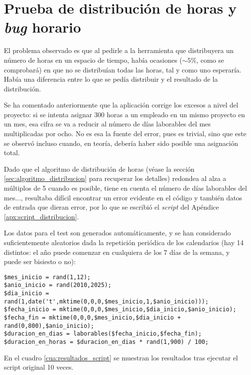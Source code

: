 \section{Prueba de distribución de horas y \textit{bug} horario}

El problema observado es que al pedirle a la herramienta que distribuyera un
número de horas en un espacio de tiempo, había ocasiones ($\sim 5\%$, como se
comprobará) en que no se distribuían todas las horas, tal y como uno esperaría.
Había una diferencia entre lo que se pedía distribuir y el resultado de la
distribución.

Se ha comentado anteriormente que la aplicación corrige los excesos a nivel del
proyecto: si se intenta asignar 300 horas a un empleado en un mismo proyecto en
un mes, esa cifra se va a reducir al número de días laborables del mes
multiplicadas por ocho. No es esa la fuente del error, pues es trivial, sino
que este se observó incluso cuando, en teoría, debería haber sido posible una
asignación total.

Dado que el algoritmo de distribución de horas (véase la sección
\ref{sec:algoritmo_distribucion} para recuperar los detalles) redondea al alza a
múltiplos de 5 cuando es posible, tiene en cuenta el número de días laborables
del mes..., resultaba difícil encontrar un error evidente en el código y
también datos de entrada que dieran error, por
lo que se escribió el \textit{script} del Apéndice
\ref{apx:script_distribucion}.

Los datos para el test son generados automáticamente, y se han
considerado suficientemente aleatorios dada la repetición periódica de los
calendarios (hay 14 distintos: el año puede comenzar en cualquiera de los 7 días
de la semana, y puede ser bisiesto o no):

\begin{lstlisting}
$mes_inicio = rand(1,12);
$anio_inicio = rand(2010,2025);
$dia_inicio = rand(1,date('t',mktime(0,0,0,$mes_inicio,1,$anio_inicio)));
$fecha_inicio = mktime(0,0,0,$mes_inicio,$dia_inicio,$anio_inicio);
$fecha_fin = mktime(0,0,0,$mes_inicio,$dia_inicio + rand(0,800),$anio_inicio);
$duracion_en_dias = laborables($fecha_inicio,$fecha_fin);
$duracion_en_horas = $duracion_en_dias * rand(1,900) / 100;
\end{lstlisting}

En el cuadro \ref{cua:resultados_script} se
muestran los resultados tras ejecutar el script original 10 veces.

